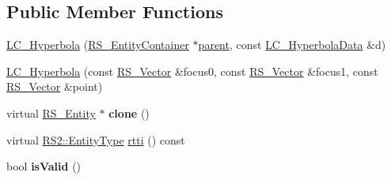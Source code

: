 \subsection*{Public Member Functions}
\begin{DoxyCompactItemize}
\item 
\hyperlink{classLC__Hyperbola_ae11fe7ad56249a936b7e2a4da53ce380}{L\-C\-\_\-\-Hyperbola} (\hyperlink{classRS__EntityContainer}{R\-S\-\_\-\-Entity\-Container} $\ast$\hyperlink{classRS__Entity_a80358a8d2fc6739a516a278dc500b49f}{parent}, const \hyperlink{classLC__HyperbolaData}{L\-C\-\_\-\-Hyperbola\-Data} \&d)
\item 
\hyperlink{classLC__Hyperbola_ab237c40b0f3c511332ec16aaf3f39e7c}{L\-C\-\_\-\-Hyperbola} (const \hyperlink{classRS__Vector}{R\-S\-\_\-\-Vector} \&focus0, const \hyperlink{classRS__Vector}{R\-S\-\_\-\-Vector} \&focus1, const \hyperlink{classRS__Vector}{R\-S\-\_\-\-Vector} \&point)
\item 
\hypertarget{classLC__Hyperbola_a51cb93f042b9ecbc2814900e155780b4}{virtual \hyperlink{classRS__Entity}{R\-S\-\_\-\-Entity} $\ast$ {\bfseries clone} ()}\label{classLC__Hyperbola_a51cb93f042b9ecbc2814900e155780b4}

\item 
virtual \hyperlink{classRS2_a8f26d1b981e1e85cff16738b43337e6a}{R\-S2\-::\-Entity\-Type} \hyperlink{classLC__Hyperbola_a1cad1c5d7cf52bc1ca17a47b11700ad0}{rtti} () const 
\item 
\hypertarget{classLC__Hyperbola_a938699072a24b25d1a115577eef274a9}{bool {\bfseries is\-Valid} ()}\label{classLC__Hyperbola_a938699072a24b25d1a115577eef274a9}


\end{DoxyCompactItemize}

